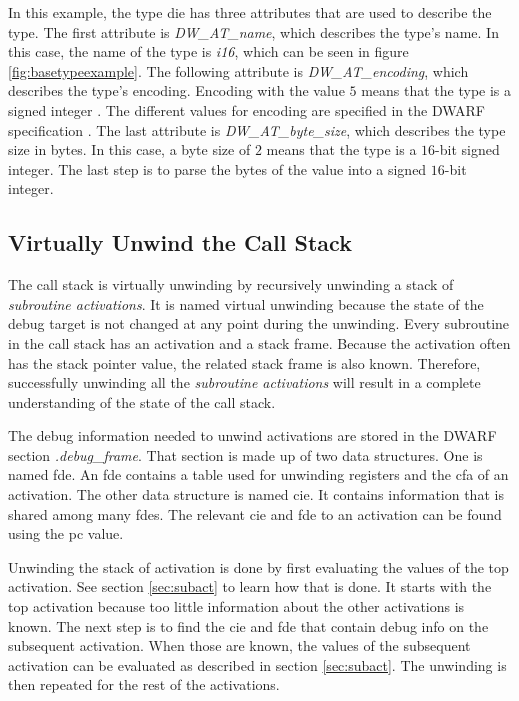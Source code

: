 In this example, the type \gls{die} has three attributes that are used to describe the type.
The first attribute is \emph{DW\_AT\_name}, which describes the type's name.
In this case, the name of the type is \emph{i16}, which can be seen in figure \ref{fig:basetypeexample}.
The following attribute is \emph{DW\_AT\_encoding}, which describes the type's encoding.
Encoding with the value $5$ means that the type is a signed integer \cite{dwarf}.
The different values for encoding are specified in the \gls{DWARF} specification \cite{dwarf}.
The last attribute is \emph{DW\_AT\_byte\_size}, which describes the type size in bytes.
In this case, a byte size of $2$ means that the type is a $16$-bit signed integer.
The last step is to parse the bytes of the value into a signed $16$-bit integer.


\subsection{Virtually Unwind the Call Stack}
\label{sec:stacktrace}
The call stack is virtually unwinding by recursively unwinding a stack of \emph{subroutine activations}.
It is named virtual unwinding because the state of the debug target is not changed at any point during the unwinding.
Every subroutine in the call stack has an activation and a stack frame.
Because the activation often has the stack pointer value, the related stack frame is also known.
Therefore, successfully unwinding all the \emph{subroutine activations} will result in a complete understanding of the state of the call stack.


The debug information needed to unwind activations are stored in the \gls{DWARF} section \emph{.debug\_frame}.
That section is made up of two data structures.
One is named \gls{fde}.
An \gls{fde} contains a table used for unwinding registers and the \gls{cfa} of an activation.
The other data structure is named \gls{cie}.
It contains information that is shared among many \glspl{fde}.
The relevant \gls{cie} and \gls{fde} to an activation can be found using the \gls{pc} value.


Unwinding the stack of activation is done by first evaluating the values of the top activation.
See section \ref{sec:subact} to learn how that is done.
It starts with the top activation because too little information about the other activations is known.
The next step is to find the \gls{cie} and \gls{fde} that contain debug info on the subsequent activation.
When those are known, the values of the subsequent activation can be evaluated as described in section \ref{sec:subact}.
The unwinding is then repeated for the rest of the activations.


